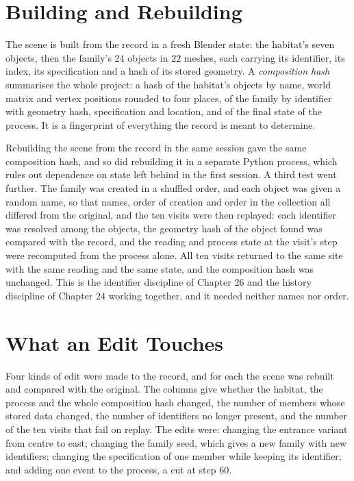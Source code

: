 \section{Building and Rebuilding}

The scene is built from the record in a fresh Blender state: the habitat's seven objects, then the family's $24$ objects in $22$ meshes, each carrying its identifier, its index, its specification and a hash of its stored geometry. A \emph{composition hash} summarises the whole project: a hash of the habitat's objects by name, world matrix and vertex positions rounded to four places, of the family by identifier with geometry hash, specification and location, and of the final state of the process. It is a fingerprint of everything the record is meant to determine.

Rebuilding the scene from the record in the same session gave the same composition hash, and so did rebuilding it in a separate Python process, which rules out dependence on state left behind in the first session. A third test went further. The family was created in a shuffled order, and each object was given a random name, so that names, order of creation and order in the collection all differed from the original, and the ten visits were then replayed: each identifier was resolved among the objects, the geometry hash of the object found was compared with the record, and the reading and process state at the visit's step were recomputed from the process alone. All ten visits returned to the same site with the same reading and the same state, and the composition hash was unchanged. This is the identifier discipline of Chapter 26 and the history discipline of Chapter 24 working together, and it needed neither names nor order.

\section{What an Edit Touches}

Four kinds of edit were made to the record, and for each the scene was rebuilt and compared with the original. The columns give whether the habitat, the process and the whole composition hash changed, the number of members whose stored data changed, the number of identifiers no longer present, and the number of the ten visits that fail on replay. The edits were: changing the entrance variant from centre to east; changing the family seed, which gives a new family with new identifiers; changing the specification of one member while keeping its identifier; and adding one event to the process, a cut at step $60$.

